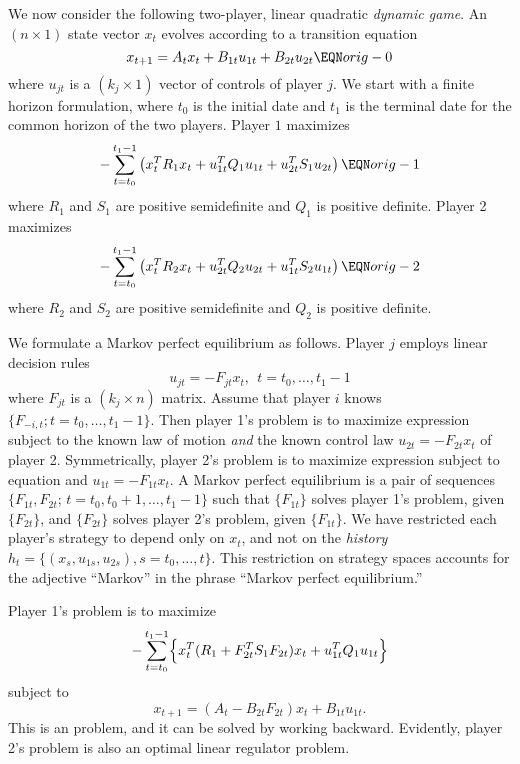 We now consider the following two-player, linear quadratic {\it dynamic
game}.  An $(n \times 1)$ state vector $x_t$ evolves according to a
transition equation
$$x_{t+1} = A_t x_t + B_{1t} u_{1t} + B_{2t} u_{2t}  \EQN orig-0$$
where
 $ u_{jt}$ is a $(k_j \times 1)$ vector of controls of
player  $j$.  We start with a finite horizon formulation, where
$t_0$ is the initial date and $t_1$ is the terminal date
for the common horizon of the two players.
Player $1$ maximizes
$$ - \sum_{t=t_0}^{t_1 - 1}  \left( x_t^T R_1 x_t + u_{1t}^T Q_1 u_{1t} +
u_{2t}^T S_1 u_{2t}\right) \EQN orig-1 $$
where $R_1$ and $S_1$ are positive semidefinite and
 $Q_1$ is positive definite.
Player 2 maximizes
$$ - \sum_{t=t_0}^{t_1 - 1} \left( x_t^T R_2 x_t + u_{2t}^T Q_2 u_{2t} +
u_{1t}^T S_2 u_{1t} \right) \EQN orig-2 $$
where $R_2$ and $S_2$ are positive semidefinite and $Q_2$ is positive definite.

We formulate a Markov perfect equilibrium as follows.  Player
$j$ employs linear decision rules
$$u_{jt} = - F_{jt}  x_t, \ \ t = t_0, \ldots, t_1 - 1$$
where $F_{jt}$ is a $(k_j \times n)$ matrix.  Assume that  player $i$ knows
$\{F_{-i,t}; t = t_0, \ldots, t_1 - 1 \}$.  Then player  1's problem is to
maximize expression
  subject to the known law of motion 
{\it and\/}
the known control law $u_{2t} = - F_{2t} x_t$ of player 2.
Symmetrically, player 2's problem is to maximize expression
 subject
to equation  and $u_{1t} = - F_{1t} x_t$. A Markov perfect
equilibrium is a pair of
sequences $\{F_{1t}, F_{2t};\, t = t_0, t_0 + 1 , \ldots,
t_1 - 1 \}$ such that $\{F_{1t}\}$ solves player 1's problem, given
$\{F_{2t}\}$, and $\{F_{2t}\}$ solves player 2's problem, given $\{F_{1t}\}$.
We have restricted each player's strategy to depend
only on $x_t$, and not on the {\it history} $h_t =\{(x_s, u_{1s}, u_{2s}),
s = t_0, \ldots, t\}$.
 This restriction on strategy spaces
 accounts for the adjective
``Markov'' in the phrase ``Markov perfect equilibrium.''

Player 1's problem is to maximize
$$ - \sum_{t=t_0}^{t_1 - 1}\Bigl\{ x_t^T (R_1 + F_{2t}^T S_1 F_{2t}) x_t
+ u_{1t}^T Q_1 u_{1t} \Bigr\} $$
subject to
$$x_{t+1} = (A_t- B_{2t} F_{2t}) x_t + B_{1t} u_{1t}. %
$$
This is an  problem, and it can be solved
by working backward. Evidently, player 2's problem is also an
optimal linear regulator problem.


